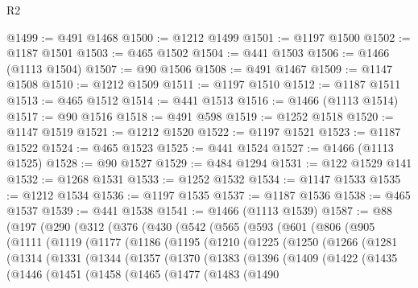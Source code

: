 \begin{lexlean}{R2}
\begin{coremodule}
{{{{{{{{{{{{{{{{{{{{{{{{{{{{{{{{{{{{{{{{{{{{{{{{{{{{{{{{{{{{{{{{{{{{{{{{{{{{{{{{{{{{{{{{{{{{@1499 := @491 @1468
@1500 := @1212 @1499
@1501 := @1197 @1500
@1502 := @1187 @1501
@1503 := @465 @1502
@1504 := @441 @1503
@1506 := @1466 (@1113 @1504)
@1507 := @90 @1506
@1508 := @491 @1467
@1509 := @1147 @1508
@1510 := @1212 @1509
@1511 := @1197 @1510
@1512 := @1187 @1511
@1513 := @465 @1512
@1514 := @441 @1513
@1516 := @1466 (@1113 @1514)
@1517 := @90 @1516
@1518 := @491 @598
@1519 := @1252 @1518
@1520 := @1147 @1519
@1521 := @1212 @1520
@1522 := @1197 @1521
@1523 := @1187 @1522
@1524 := @465 @1523
@1525 := @441 @1524
@1527 := @1466 (@1113 @1525)
@1528 := @90 @1527
@1529 := @484 @1294
@1531 := @122 @1529 @141
@1532 := @1268 @1531
@1533 := @1252 @1532
@1534 := @1147 @1533
@1535 := @1212 @1534
@1536 := @1197 @1535
@1537 := @1187 @1536
@1538 := @465 @1537
@1539 := @441 @1538
@1541 := @1466 (@1113 @1539)
@1587 := @88
    (@197
      (@290
        (@312
          (@376
            (@430
              (@542
                (@565
                  (@593
                    (@601
                      (@806
                        (@905
                          (@1111
                            (@1119
                              (@1177
                                (@1186
                                  (@1195
                                    (@1210
                                      (@1225
                                        (@1250
                                          (@1266
                                            (@1281
                                              (@1314
                                                (@1331
                                                  (@1344
                                                    (@1357
                                                      (@1370
                                                        (@1383
                                                          (@1396
                                                            (@1409
                                                              (@1422
                                                                (@1435
                                                                  (@1446
                                                                    (@1451
                                                                      (@1458
                                                                        (@1465
                                                                          (@1477
                                                                            (@1483
                                                                              (@1490
}}}}}}}}}}}}}}}}}}}}}}}}}}}}}}}}}}}}}}}}}}}}}}}}}}}}}}}}}}}}}}}}}}}}}}}}}}}}}}}}}}}}}}}}}}}}
\end{coremodule}
\end{lexlean}
